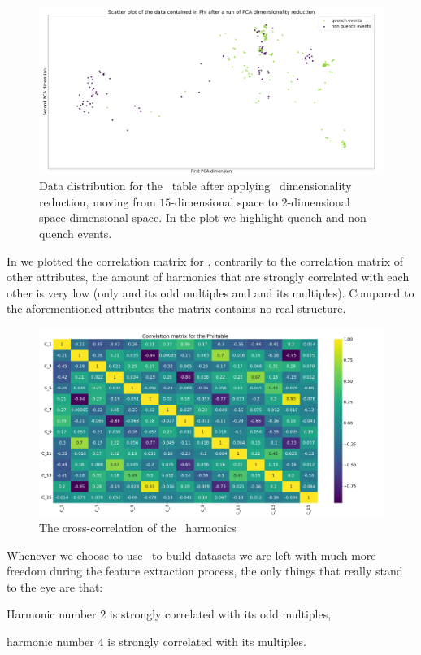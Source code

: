 \begin{figure}[!ht]
	\centering
	\includegraphics[width=\linewidth]{img/Phi_distribution.png}
	\caption{Data distribution for the \phin\ table after applying \pca\ dimensionality
		reduction, moving from $15$-dimensional space to $2$-dimensional space-dimensional
		space. In the plot we highlight quench and non-quench events.} \label{fig:phi-dist}
\end{figure}

In  we plotted the correlation matrix for \phin, contrarily to the correlation
matrix of other attributes, the amount of harmonics that are strongly correlated with each other is very
low (only \phin[2] and its odd multiples and \phin[4] and its multiples). Compared to the
aforementioned attributes the matrix contains no real structure.
\begin{figure}[!ht]
	\centering
	\includegraphics[width=\linewidth]{img/Phi_corr_matrix.png}
	\caption{The cross-correlation of the \phin\ harmonics} \label{fig:phi-corr}
\end{figure}
Whenever we choose to use \phin\ to build datasets we are left with much more freedom during the
feature extraction process, the only things that really stand to the eye are that:
\begin{inparaenum}[(i)]
	\item Harmonic number $2$ is strongly correlated with its odd multiples,
	\item harmonic number $4$ is strongly correlated with its multiples.
\end{inparaenum}

